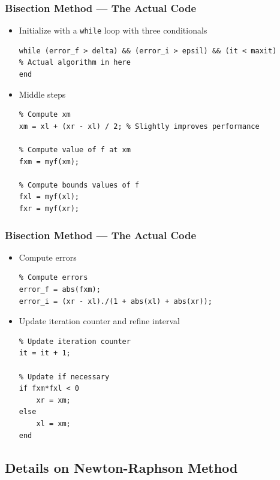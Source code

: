 \documentclass[11pt,xcolor={svgnames},aspectratio=169,usepdftitle=false,notheorems]{beamer}
\begin{document}
\begin{frame}[fragile]
  \frametitle{Bisection Method --- The Actual Code}
  \begin{itemize}
    \item Initialize with a \verb;while; loop with three conditionals
\begin{lstlisting}
while (error_f > delta) && (error_i > epsil) && (it < maxit)
% Actual algorithm in here
end     
\end{lstlisting}
    \item Middle steps
\begin{lstlisting}
% Compute xm
xm = xl + (xr - xl) / 2; % Slightly improves performance

% Compute value of f at xm
fxm = myf(xm);

% Compute bounds values of f
fxl = myf(xl);
fxr = myf(xr);
\end{lstlisting}
\end{itemize}
\end{frame}

\begin{frame}[fragile]
  \frametitle{Bisection Method --- The Actual Code}
\begin{itemize}
  \item Compute errors
\begin{lstlisting}
% Compute errors
error_f = abs(fxm);
error_i = (xr - xl)./(1 + abs(xl) + abs(xr));
\end{lstlisting}
\item Update iteration counter and refine interval
\begin{lstlisting}
% Update iteration counter
it = it + 1;

% Update if necessary
if fxm*fxl < 0
    xr = xm;
else
    xl = xm;
end
\end{lstlisting}
\end{itemize}
\end{frame}

\subsection{Details on Newton-Raphson Method}
\end{document}
